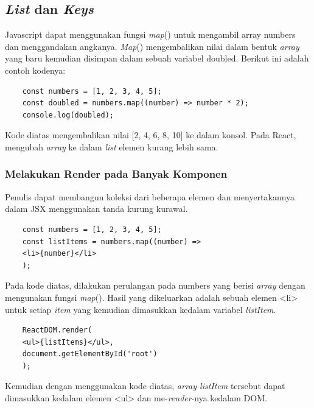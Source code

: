 \subsection{\textit{List} dan \textit{Keys}}
Javascript dapat menggunakan fungsi \textit{map}() untuk mengambil array numbers dan menggandakan angkanya. \textit{Map}() mengembalikan nilai dalam bentuk \textit{array} yang baru kemudian disimpan dalam sebuah variabel doubled.
Berikut ini adalah contoh kodenya:
\begin{lstlisting}
	const numbers = [1, 2, 3, 4, 5];
	const doubled = numbers.map((number) => number * 2);
	console.log(doubled);
\end{lstlisting}
Kode diatas mengembalikan nilai [2, 4, 6, 8, 10] ke dalam konsol. Pada React, mengubah \textit{array} ke dalam \textit{list} elemen kurang lebih sama.
\subsubsection{Melakukan Render pada Banyak Komponen}
Penulis dapat membangun koleksi dari beberapa elemen dan menyertakannya dalam JSX  menggunakan tanda kurung kurawal. 
\begin{lstlisting}
	const numbers = [1, 2, 3, 4, 5];
	const listItems = numbers.map((number) =>
	<li>{number}</li>
	);
\end{lstlisting}
Pada kode diatas, dilakukan perulangan pada numbers yang berisi \textit{array} dengan mengunakan fungsi \textit{map}(). Hasil yang dikeluarkan adalah sebuah elemen <li> untuk setiap \textit{item} yang kemudian dimasukkan kedalam variabel \textit{listItem}. 
\begin{lstlisting}
	ReactDOM.render(
	<ul>{listItems}</ul>,
	document.getElementById('root')
	);
\end{lstlisting}
Kemudian dengan menggunakan kode diatas, \textit{array listItem} tersebut dapat dimasukkan kedalam elemen <ul> dan me-\textit{render}-nya kedalam DOM.

